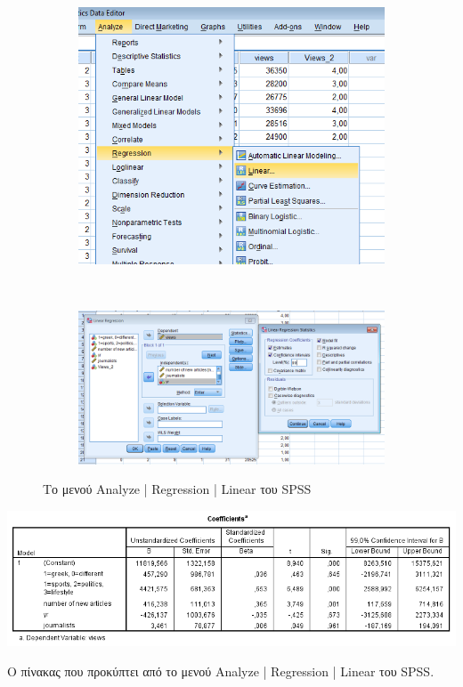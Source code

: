 \documentclass{assignment}
\begin{document}
\begin{Assignment}[Μέρος Γ]
\begin{figure}[htbp]
  \centering
  \begin{subfigure}[b]{0.5\textwidth}
     \includegraphics[width=\textwidth,height=0.25\textheight]{images/menu_regression_linear.png}
  \end{subfigure}%
   ~ %
  \begin{subfigure}[b]{0.5\textwidth}
    \includegraphics[width=\textwidth,height=0.25\textheight]{images/regression_linear.png}
  \end{subfigure}
  \caption{Το μενού Analyze | Regression | Linear του SPSS}
\label{fig:regression_linear}
\end{figure}


\begin{table}[htbp]
\includegraphics[width=\textwidth]{images/table_regression_linear.png}
\caption{Ο πίνακας που προκύπτει από το μενού Analyze | Regression | Linear του SPSS.}
\label{table:regression_linear}
\end{table}


\end{Assignment}
\end{document}
